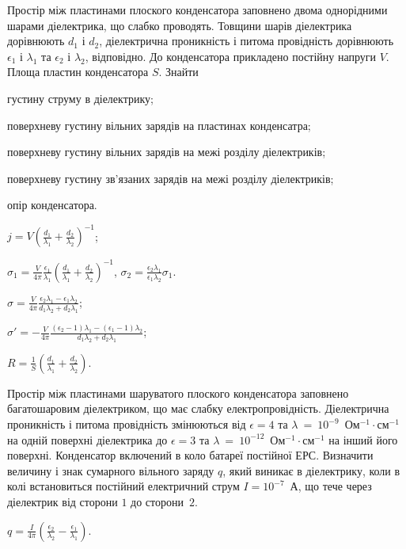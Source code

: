 \begin{problem}%
Простір між пластинами плоского конденсатора заповнено двома однорідними шарами діелектрика, що слабко проводять. Товщини шарів діелектрика дорівнюють $d_1$ і $d_2$, діелектрична проникність і питома провідність дорівнюють $\epsilon_1$ і $\lambda_1$ та $\epsilon_2$ і $\lambda_2$, відповідно. До конденсатора прикладено постійну напруги $V$. Площа пластин конденсатора $S$. Знайти
	\begin{enumerate*}[label=\alph*)]
		\item густину струму в діелектрику;
		\item поверхневу густину вільних зарядів на пластинах конденсатра;
		\item поверхневу густину вільних зарядів на межі розділу діелектриків;
		\item поверхневу густину зв'язаних зарядів на межі розділу діелектриків;
		\item опір конденсатора.
	\end{enumerate*}

\begin{solution}
	\begin{enumerate*}[label=\alph*)]
		\item  $j = V\left( \frac{d_1}{\lambda_1} + \frac{d_2}{\lambda_2}\right)^{-1}$;
		\item $\sigma_1  = \frac{V}{4\pi} \frac{\epsilon_1}{\lambda_1} \left( \frac{d_1}{\lambda_1} + \frac{d_2}{\lambda_2}\right)^{-1}$, $\sigma_2  = \frac{\epsilon_2\lambda_1}{\epsilon_1\lambda_2} \sigma_1$.
		\item $\sigma = \frac{V}{4\pi} \frac{\epsilon_2\lambda_1 - \epsilon_1\lambda_2}{d_1\lambda_2 + d_2\lambda_1}$;
		\item $\sigma' = - \frac{V}{4\pi} \frac{(\epsilon_2 - 1)\lambda_1 - (\epsilon_1 - 1)\lambda_2}{d_1\lambda_2 + d_2\lambda_1}$;
		\item $R = \frac1S\left( \frac{d_1}{\lambda_1} + \frac{d_2}{\lambda_2}\right) $.
	\end{enumerate*}
\end{solution}
\end{problem}

\begin{problem} %
Простір між пластинами шаруватого плоского конденсатора заповнено багатошаровим діелектриком, що має слабку електропровідність. Діелектрична проникність і питома провідність змінюються від $\epsilon = 4$ та $\lambda~=~10^{-9}$~Ом$^{-1}\cdot$см$^{-1}$ на одній поверхні діелектрика до $\epsilon = 3$ та $\lambda~=~10^{-12}$~Ом$^{-1}\cdot$см$^{-1}$ на інший його поверхні. Конденсатор включений в коло батареї постійної ЕРС. Визначити величину і знак сумарного вільного заряду $q$, який виникає в діелектрику, коли в колі встановиться постійний електричний струм $I = 10^{-7}$~А, що тече через діелектрик від сторони $1$ до сторони~$2$.
\begin{solution}
	$q  = \frac{I}{4\pi} \left( \frac{\epsilon_2}{\lambda_2} - \frac{\epsilon_1}{\lambda_1}\right) $.
\end{solution}
\end{problem}

